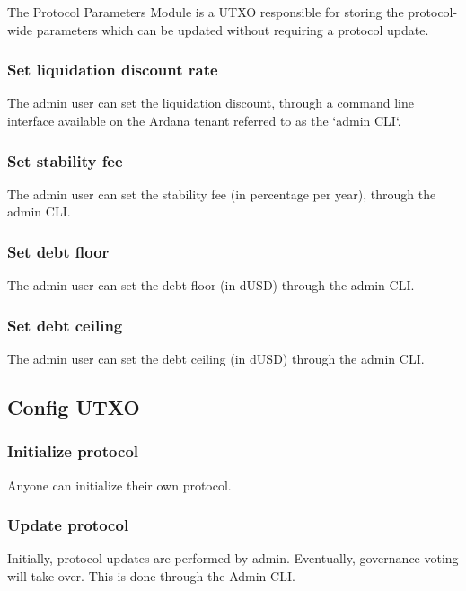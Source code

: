 \documentclass{article} %
\begin{document}
The Protocol Parameters Module is a UTXO responsible for storing the
protocol-wide parameters which can be updated without requiring a protocol
update.

\subsubsection*{Set liquidation discount rate}

The admin user can set the liquidation discount, through a command line
interface available on the Ardana tenant referred to as the `admin CLI`.

\subsubsection*{Set stability fee}

The admin user can set the stability fee (in percentage per year), through the
admin CLI.

\subsubsection*{Set debt floor}

The admin user can set the debt floor (in dUSD) through the admin CLI.

\subsubsection*{Set debt ceiling}

The admin user can set the debt ceiling (in dUSD) through the admin CLI.

\subsection{Config UTXO}

\subsubsection*{Initialize protocol}

Anyone can initialize their own protocol.

\subsubsection*{Update protocol}

Initially, protocol updates are performed by admin. Eventually, governance
voting will take over. This is done through the Admin CLI.
\end{document}
